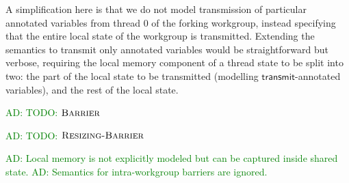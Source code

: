 \documentclass[numbers,nocopyrightspace,10pt]{sigplanconf}
\newcommand{\ADComment}[1]{\textcolor{green}{AD: #1}}
\newcommand{\transmit}{\mathsf{transmit}}
\begin{document}
A simplification here is that we do not model transmission of
particular annotated variables from thread 0 of the forking workgroup,
instead specifying that the entire local state of the workgroup is
transmitted.  Extending the semantics to transmit only annotated
variables would be straightforward but verbose, requiring the local
memory component of a thread state to be split into two: the part of
the local state to be transmitted (modelling $\transmit$-annotated
variables), and the rest of the local state.

\ADComment{TODO: $\textsc{Barrier}$}

\ADComment{TODO: $\textsc{Resizing-Barrier}$}


 \ADComment{Local memory is not
  explicitly modeled but can be captured inside shared state.}
\ADComment{Semantics for intra-workgroup barriers are ignored.}
\end{document}

